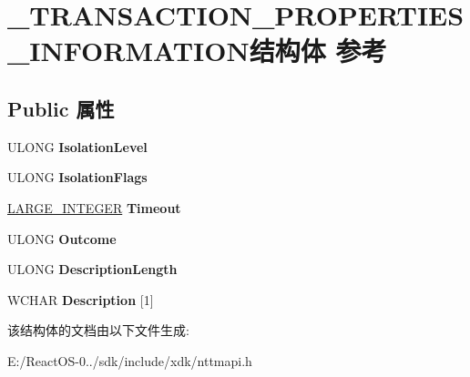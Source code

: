 \hypertarget{struct___t_r_a_n_s_a_c_t_i_o_n___p_r_o_p_e_r_t_i_e_s___i_n_f_o_r_m_a_t_i_o_n}{}\section{\+\_\+\+T\+R\+A\+N\+S\+A\+C\+T\+I\+O\+N\+\_\+\+P\+R\+O\+P\+E\+R\+T\+I\+E\+S\+\_\+\+I\+N\+F\+O\+R\+M\+A\+T\+I\+O\+N结构体 参考}
\label{struct___t_r_a_n_s_a_c_t_i_o_n___p_r_o_p_e_r_t_i_e_s___i_n_f_o_r_m_a_t_i_o_n}
\subsection*{Public 属性}
\begin{DoxyCompactItemize}
\item 
\mbox{\label{struct___t_r_a_n_s_a_c_t_i_o_n___p_r_o_p_e_r_t_i_e_s___i_n_f_o_r_m_a_t_i_o_n_a4b96448eeb52378014da1deee1b19993}} 
U\+L\+O\+NG {\bfseries Isolation\+Level}
\item 
\mbox{\label{struct___t_r_a_n_s_a_c_t_i_o_n___p_r_o_p_e_r_t_i_e_s___i_n_f_o_r_m_a_t_i_o_n_a342876f1072f41f5385624e06bbda278}} 
U\+L\+O\+NG {\bfseries Isolation\+Flags}
\item 
\mbox{\label{struct___t_r_a_n_s_a_c_t_i_o_n___p_r_o_p_e_r_t_i_e_s___i_n_f_o_r_m_a_t_i_o_n_a62acc62bbae7ef90c93722629f1932ed}} 
\hyperlink{union___l_a_r_g_e___i_n_t_e_g_e_r}{L\+A\+R\+G\+E\+\_\+\+I\+N\+T\+E\+G\+ER} {\bfseries Timeout}
\item 
\mbox{\label{struct___t_r_a_n_s_a_c_t_i_o_n___p_r_o_p_e_r_t_i_e_s___i_n_f_o_r_m_a_t_i_o_n_afe2f158762ee78e8f23ee2d4f7dea4a9}} 
U\+L\+O\+NG {\bfseries Outcome}
\item 
\mbox{\label{struct___t_r_a_n_s_a_c_t_i_o_n___p_r_o_p_e_r_t_i_e_s___i_n_f_o_r_m_a_t_i_o_n_af3da1b3838651abcffe80402383682da}} 
U\+L\+O\+NG {\bfseries Description\+Length}
\item 
\mbox{\label{struct___t_r_a_n_s_a_c_t_i_o_n___p_r_o_p_e_r_t_i_e_s___i_n_f_o_r_m_a_t_i_o_n_a62297575c1619be0666f6f69276ed471}} 
W\+C\+H\+AR {\bfseries Description} \mbox{[}1\mbox{]}
\end{DoxyCompactItemize}


该结构体的文档由以下文件生成\+:\begin{DoxyCompactItemize}
\item 
E\+:/\+React\+O\+S-\/0../sdk/include/xdk/nttmapi.\+h\end{DoxyCompactItemize}
